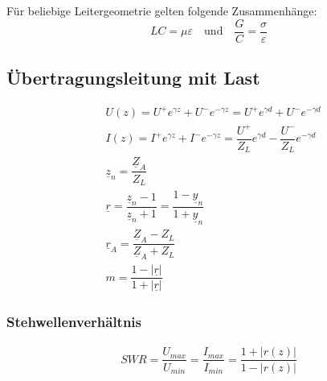 Für beliebige Leitergeometrie gelten folgende Zusammenhänge:
\[
    LC = \mu\varepsilon \quad \text{und} \quad \frac{G}{C} = \frac{\sigma}{\varepsilon}
\]

\subsection{Übertragungsleitung mit Last}
\begin{align*}
     & U(z) = U^+ e^{\gamma z} + U^- e^{-\gamma z} = U^+ e^{\gamma d} + U^ - e^{-\gamma d}                        \\
     & I(z) = I^+ e^{\gamma z} + I^- e^{-\gamma z} = \dfrac{U^+}{Z_L}e^{\gamma d} - \dfrac{U^-}{Z_L}e^{-\gamma d} \\
     & \underline{z}_n = \dfrac{\underline{Z}_A}{Z_L}                                                             \\
     & \underline{r} = \dfrac{\underline{z}_n-1}{\underline{z}_n+1}= \dfrac{1-\underline{y}_n}{1+\underline{y}_n} \\
     & \underline{r}_A = \dfrac{\underline{Z}_A-Z_L}{\underline{Z}_A+Z_L}                                         \\
     & m = \dfrac{1-|\underline{r}|}{1+|\underline{r}|}
\end{align*}
\subsubsection{Stehwellenverhältnis}
\begin{align*}
    SWR = \dfrac{U_{max}}{U_{min}} = \dfrac{I_{max}}{I_{min}} = \dfrac{1+|r(z)|}{1-|r(z)|}
\end{align*}
